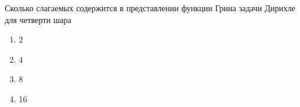 Сколько слагаемых содержится в представлении функции Грина задачи Дирихле для четверти шара

\begin{enumerate}[label=\arabic*)]
    \item 2
    \item 4
    \item 8
    \item 16
\end{enumerate}

